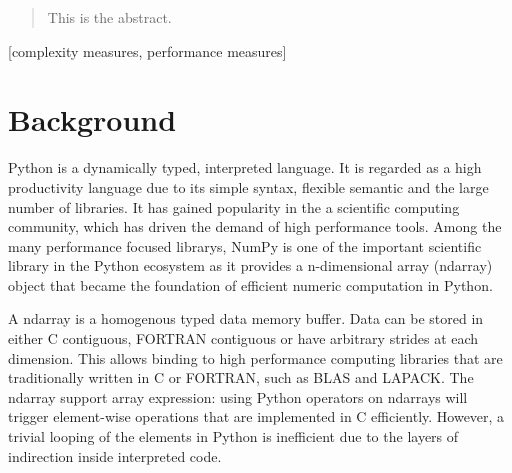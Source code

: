 \documentclass{acm_proc_article-sp}
\begin{document}
\date{30 July 1999}

\maketitle
\begin{abstract}
This is the abstract.
\end{abstract}

[complexity measures, performance measures]



\section{Background}

Python is a dynamically typed, interpreted language.
It is regarded as a high productivity language due to its simple syntax,
flexible semantic and the large number of libraries.
It has gained popularity in the a scientific computing community,
which has driven the demand of high performance tools.
Among the many performance focused librarys, NumPy is one of the important
scientific library in the Python ecosystem as it provides a n-dimensional
array (ndarray) object that became the foundation of efficient numeric
computation in Python.

A ndarray is a homogenous typed data memory buffer.
Data can be stored in either C contiguous, FORTRAN contiguous or have arbitrary
strides at each dimension.  This allows binding to high performance computing
libraries that are traditionally written in C or FORTRAN, such as BLAS and
LAPACK. The ndarray support array expression: using Python operators on
ndarrays will trigger element-wise operations that are implemented in C
efficiently.  However, a trivial looping of the elements in Python is
inefficient due to the layers of indirection inside interpreted code.
\end{document}
